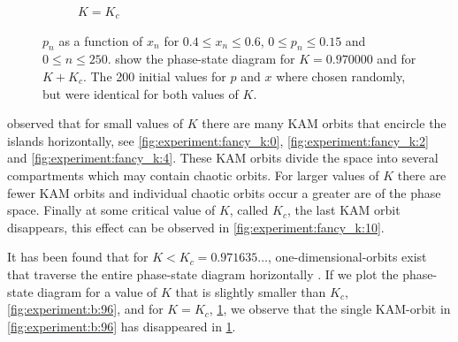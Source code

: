 \begin{figure}[t]
\begin{subfigure}{\columnwidth}
		\caption{$K = K_c$}
		\label{fig:experiment:b:KC}
	\end{subfigure}	
	\caption{$p_n$ as a function of $x_n$ for $0.4 \leq x_n \leq 0.6$, $0 \leq p_n \leq 0.15$ and $0 \leq n \leq 250$.  show the phase-state diagram for $K = 0.970000$ and  for $K + K_c$. The 200 initial values for $p$ and $x$ where chosen randomly, but were identical for both values of $K$.}
	\label{fig:experiment:b:testKC}
\end{figure}

\citeauthor{greene1979method} observed that for small values of $K$ there are many KAM orbits that encircle the islands horizontally, see \cref{fig:experiment:fancy_k:0}, \ref{fig:experiment:fancy_k:2} and \ref{fig:experiment:fancy_k:4}. These KAM orbits divide the space into several compartments which may contain chaotic orbits. For larger values of $K$ there are fewer KAM orbits and individual chaotic orbits occur a greater are of the phase space. Finally at some critical value of $K$, called $K_c$, the last KAM orbit disappears, this effect can be observed in \cref{fig:experiment:fancy_k:10}. 

It has been found that for $K < K_c = 0.971635\dotsc$, one-dimensional-orbits exist that traverse the entire phase-state diagram horizontally \cite{kenzel1997physics}. If we plot the phase-state diagram for a value of $K$ that is slightly smaller than $K_c$, \cref{fig:experiment:b:96}, and for $K = K_c$, \cref{fig:experiment:b:KC}, we observe that the single KAM-orbit in \cref{fig:experiment:b:96} has disappeared in \cref{fig:experiment:b:KC}. 


